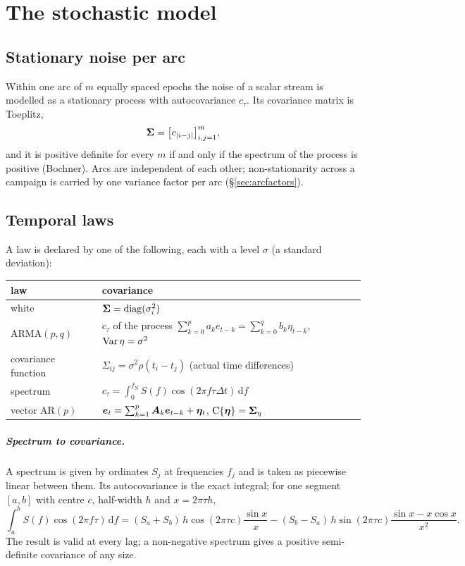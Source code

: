 \chapter{The stochastic model}\label{ch:stochastic}

\section{Stationary noise per arc}

Within one arc of $m$ equally spaced epochs the noise of a scalar stream is modelled as a
stationary process with autocovariance $c_\tau$. Its covariance matrix is Toeplitz,
\begin{equation}\label{eq:toeplitz}
\bm{\Sigma}=\bigl[c_{|i-j|}\bigr]_{i,j=1}^m ,
\end{equation}
and it is positive definite for every $m$ if and only if the spectrum of the process is positive
(Bochner). Arcs are independent of each other; non-stationarity across a campaign is carried by
one variance factor per arc (\S\ref{sec:arcfactors}).

\section{Temporal laws}

A law is declared by one of the following, each with a level $\sigma$ (a standard deviation):

\begin{center}
\begin{tabular}{@{}ll@{}}
\toprule
law & covariance \\ \midrule
white & $\bm{\Sigma}=\operatorname{diag}(\sigma_i^2)$ \\
ARMA$(p,q)$ & $c_\tau$ of the process $\sum_{k=0}^p a_ke_{t-k}=\sum_{k=0}^q b_k\eta_{t-k}$, $\operatorname{Var}\eta=\sigma^2$\\
covariance function & $\Sigma_{ij}=\sigma^2\rho(t_i-t_j)$ (actual time differences) \\
spectrum & $c_\tau=\int_0^{f_{\mathrm N}}S(f)\cos(2\pi f\tau\Delta t)\,\mathrm df$ \\
vector AR$(p)$ & $\bm{e}_t=\sum_{k=1}^p\bm{A}_k\bm{e}_{t-k}+\bm{\eta}_t$, $\mathrm C\{\bm{\eta}\}=\bm{\Sigma}_\eta$ \\
\bottomrule
\end{tabular}
\end{center}

\paragraph{Spectrum to covariance.} A spectrum is given by ordinates $S_j$ at frequencies $f_j$
and is taken as piecewise linear between them. Its autocovariance is the exact integral; for one
segment $[a,b]$ with centre $c$, half-width $h$ and $x=2\pi\tau h$,
\begin{equation}\label{eq:psd2acv}
\int_a^b S(f)\cos(2\pi f\tau)\,\mathrm df=(S_a+S_b)\,h\cos(2\pi\tau c)\frac{\sin x}{x}
-(S_b-S_a)\,h\sin(2\pi\tau c)\frac{\sin x-x\cos x}{x^2}.
\end{equation}
The result is valid at every lag; a non-negative spectrum gives a positive semi-definite
covariance of any size.

